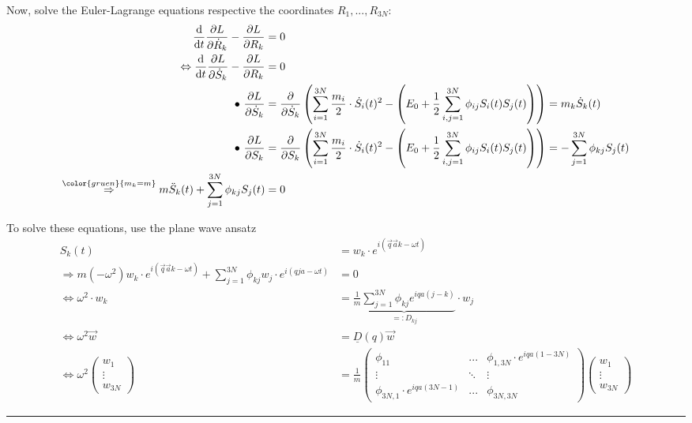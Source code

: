 \documentclass{article}
\newcommand{\diff}{\mathrm{d}}
\newcommand{\lr}[1]{\left(#1\right)}
\newcommand{\comment}[1]{{\color{gruen} {#1}}}
\begin{document}
{	Now, solve the Euler-Lagrange equations respective the coordinates $R_1, ..., R_{3N}$:
		\begin{align*}
			\frac{\diff}{\diff t} \frac{\partial L}{\partial \dot{R}_k} - \frac{\partial L}{\partial R_k} &= 0 \\
			\Leftrightarrow \frac{\diff}{\diff t} \frac{\partial L}{\partial \dot{S}_k} - \frac{\partial L}{\partial R_k} &= 0 \\
			\bullet\ \frac{\partial L}{\partial \dot{S}_k} &= \frac{\partial}{\partial \dot{S}_k} \lr{ \sum_{i=1}^{3N} \frac{m_i}{2} \cdot \dot{S}_i(t)^2 - \lr{ E_0 + \frac{1}{2} \sum_{i,j=1}^{3N} \phi_{ij} S_i(t) S_j(t) } } = m_k \dot{S}_k(t) \\
			\bullet\ \frac{\partial L}{\partial S_k} &= \frac{\partial}{\partial S_k} \lr{ \sum_{i=1}^{3N} \frac{m_i}{2} \cdot \dot{S}_i(t)^2 - \lr{ E_0 + \frac{1}{2} \sum_{i,j=1}^{3N} \phi_{ij} S_i(t) S_j(t) } } = -\sum_{j=1}^{3N} \phi_{kj} S_j(t) \\
			\stackrel{\comment{m_k = m}}{\Rightarrow} m \ddot{S}_k(t) + \sum_{j=1}^{3N} \phi_{kj} S_j(t) &= 0
		\end{align*}

	To solve these equations, use the plane wave ansatz
		\begin{align*}
			S_k(t) &= w_k \cdot e^{i(\vec{q}\vec{a}k - \omega t)} \\
			\Rightarrow m (-\omega^2) w_k \cdot e^{i(\vec{q}\vec{a}k - \omega t)} + \sum_{j=1}^{3N} \phi_{kj} w_j \cdot e^{i(qja - \omega t)} &= 0 \\
			\Leftrightarrow \omega^2 \cdot w_k &= \underbrace{ \frac{1}{m} \sum_{j=1}^{3N} \phi_{kj} e^{iqa(j-k)} }_{=: D_{kj}} \cdot w_j \\
			\Leftrightarrow \omega^2 \vec{w} &= \underline{D}(q) \vec{w} \\
			\Leftrightarrow
			\omega^2
			\begin{pmatrix}
				w_1\\ \vdots \\ w_{3N}
			\end{pmatrix}
			&=
			\frac{1}{m}
			\begin{pmatrix}
				\phi_{11} & ... & \phi_{1,3N} \cdot e^{iqa(1-3N)} \\
				\vdots & \ddots & \vdots \\
				\phi_{3N,1} \cdot e^{iqa(3N-1)} & ... & \phi_{3N,3N}
			\end{pmatrix}
			\begin{pmatrix}
				w_1 \\ \vdots \\ w_{3N}
			\end{pmatrix}
		\end{align*}
	
	


\hrule
}
\end{document}
